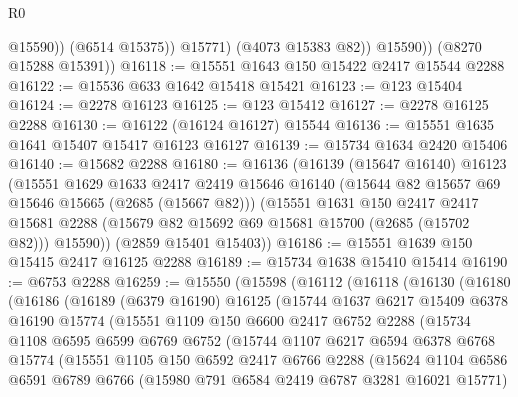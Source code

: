 \begin{lexlean}{R0}
\begin{coremodule}
                    @15590))
                (@6514 @15375))
              @15771)
            (@4073 @15383 @82))
          @15590))
      (@8270 @15288 @15391))
@16118 := @15551 @1643 @150 @15422 @2417 @15544 @2288
@16122 := @15536 @633 @1642 @15418 @15421
@16123 := @123 @15404
@16124 := @2278 @16123
@16125 := @123 @15412
@16127 := @2278 @16125 @2288
@16130 := @16122 (@16124 @16127) @15544
@16136 := @15551 @1635 @1641 @15407 @15417 @16123 @16127
@16139 := @15734 @1634 @2420 @15406
@16140 := @15682 @2288
@16180 := @16136
    (@16139
      (@15647 @16140)
      @16123
      (@15551
        @1629
        @1633
        @2417
        @2419
        @15646
        @16140
        (@15644 @82 @15657 @69 @15646 @15665 (@2685 (@15667 @82)))
        (@15551
          @1631
          @150
          @2417
          @2417
          @15681
          @2288
          (@15679 @82 @15692 @69 @15681 @15700 (@2685 (@15702 @82)))
          @15590))
      (@2859 @15401 @15403))
@16186 := @15551 @1639 @150 @15415 @2417 @16125 @2288
@16189 := @15734 @1638 @15410 @15414
@16190 := @6753 @2288
@16259 := @15550
    (@15598
      (@16112
        (@16118
          (@16130
            (@16180
              (@16186
                (@16189
                  (@6379 @16190)
                  @16125
                  (@15744
                    @1637
                    @6217
                    @15409
                    @6378
                    @16190
                    @15774
                    (@15551
                      @1109
                      @150
                      @6600
                      @2417
                      @6752
                      @2288
                      (@15734
                        @1108
                        @6595
                        @6599
                        @6769
                        @6752
                        (@15744
                          @1107
                          @6217
                          @6594
                          @6378
                          @6768
                          @15774
                          (@15551
                            @1105
                            @150
                            @6592
                            @2417
                            @6766
                            @2288
                            (@15624
                              @1104
                              @6586
                              @6591
                              @6789
                              @6766
                              (@15980 @791 @6584 @2419 @6787 @3281 @16021 @15771)

\end{coremodule}
\end{lexlean}
